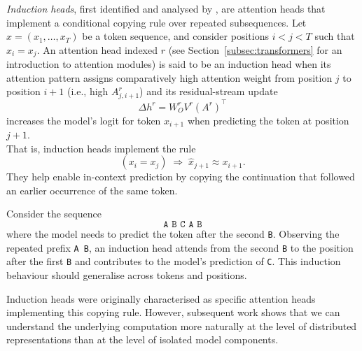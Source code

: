 \begin{definitionbox}
\label{def:induction-heads}

\emph{Induction heads}, first identified and analysed by
, are attention heads that
implement a conditional copying rule over repeated subsequences. Let
$x=(x_1,\dots,x_T)$ be a token sequence, and consider positions $i<j<T$ such
that $x_i=x_j$. An attention head indexed $r$ (see Section~\ref{subsec:transformers} for an introduction to attention modules) is said to be an induction head when its
attention pattern assigns comparatively high attention weight from position
$j$ to position $i+1$ (i.e., high $A^r_{j,i+1}$) and its residual-stream update
\[
\Delta h^r
=
W_O^r V^r (A^r)^\top
\]
increases the model's logit for token $x_{i+1}$ when predicting the token at position $j+1$.\\

That is, induction heads implement the rule
\[
(x_i=x_j)
\;\Rightarrow\;
\hat{x}_{j+1}\approx x_{i+1}.
\]
They help enable in-context prediction by copying the continuation that followed an
earlier occurrence of the same token.

\end{definitionbox}

\begin{examplebox}
Consider the sequence
\[
\texttt{A B C A B}
\]
where the model needs to predict the token after the second \texttt{B}. Observing the repeated prefix \texttt{A B}, an induction head attends from the second \texttt{B} to the position after the first \texttt{B} and contributes to the model’s prediction of \texttt{C}. This induction behaviour should generalise across tokens and positions.
\end{examplebox}


Induction heads were originally characterised as specific attention heads implementing this copying rule. However, subsequent work shows that we can understand the underlying computation more naturally at the level of distributed representations than at the level of isolated model components.

